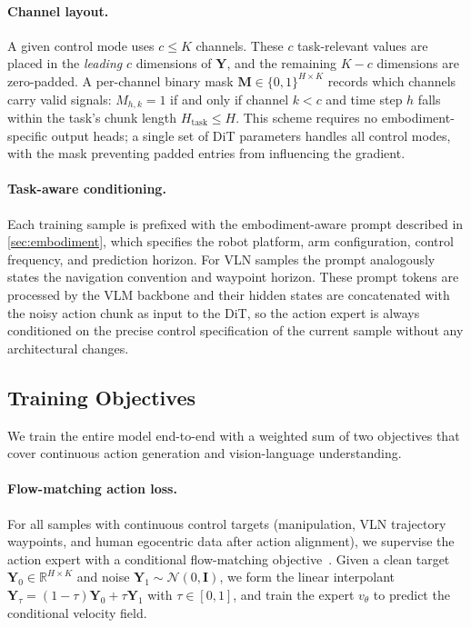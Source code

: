\documentclass{llmxive}
\begin{document}
\paragraph{Channel layout.}
\label{sec:unified_rep:channel_mask}
A given control mode uses $c \leq K$ channels.
These $c$ task-relevant values are placed in the \emph{leading} $c$ dimensions of $\mathbf{Y}$, and the remaining $K - c$ dimensions are zero-padded.
A per-channel binary mask $\mathbf{M} \in \{0,1\}^{H \times K}$ records which channels carry valid signals: $M_{h,k} = 1$ if and only if channel $k < c$ and time step $h$ falls within the task's chunk length $H_{\text{task}} \leq H$.
This scheme requires no embodiment-specific output heads; a single set of DiT parameters handles all control modes, with the mask preventing padded entries from influencing the gradient.

\paragraph{Task-aware conditioning.}
Each training sample is prefixed with the embodiment-aware prompt described in \cref{sec:embodiment}, which specifies the robot platform, arm configuration, control frequency, and prediction horizon.
For VLN samples the prompt analogously states the navigation convention and waypoint horizon.
These prompt tokens are processed by the VLM backbone and their hidden states are concatenated with the noisy action chunk as input to the DiT, so the action expert is always conditioned on the precise control specification of the current sample without any architectural changes.


\subsection{Training Objectives}
We train the entire model end-to-end with a weighted sum of two objectives that cover continuous action generation and vision-language understanding.

\paragraph{Flow-matching action loss.}
For all samples with continuous control targets (manipulation, VLN trajectory waypoints, and human egocentric data after action alignment), we supervise the action expert with a conditional flow-matching objective~\citep{lipman2023flow}.
Given a clean target $\mathbf{Y}_0 \in \mathbb{R}^{H \times K}$ and noise $\mathbf{Y}_1 \sim \mathcal{N}(0, \mathbf{I})$, we form the linear interpolant $\mathbf{Y}_\tau = (1-\tau)\mathbf{Y}_0 + \tau \mathbf{Y}_1$ with $\tau \in [0,1]$, and train the expert $v_\theta$ to predict the conditional velocity field.
\end{document}
